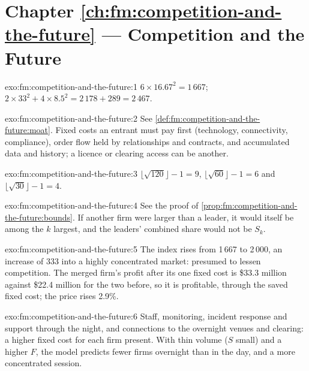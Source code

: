 \section*{Chapter \ref{ch:fm:competition-and-the-future} --- Competition and the Future}

\begin{solution}{exo:fm:competition-and-the-future:1}
$6\times16.67^2=1\,667$; $2\times33^2+4\times8.5^2=2\,178+289=2\,467$.
\end{solution}

\begin{solution}{exo:fm:competition-and-the-future:2}
See \cref{def:fm:competition-and-the-future:moat}. Fixed costs an entrant must pay first (technology, connectivity, compliance), order flow held by
relationships and contracts, and accumulated data and history; a licence or clearing access can be another.
\end{solution}

\begin{solution}{exo:fm:competition-and-the-future:3}
$\lfloor\sqrt{120}\rfloor-1=9$, $\lfloor\sqrt{60}\rfloor-1=6$ and $\lfloor\sqrt{30}\rfloor-1=4$.
\end{solution}

\begin{solution}{exo:fm:competition-and-the-future:4}
See the proof of \cref{prop:fm:competition-and-the-future:bounds}. If another firm were larger than a leader, it would itself be among the $k$
largest, and the leaders' combined share would not be $S_k$.
\end{solution}

\begin{solution}{exo:fm:competition-and-the-future:5}
The index rises from 1\,667 to 2\,000, an increase of 333 into a highly concentrated market: presumed to lessen competition. The merged firm's
profit after its one fixed cost is \$33.3 million against \$22.4 million for the two before, so it is profitable, through the saved fixed cost; the
price rises 2.9\%.
\end{solution}

\begin{solution}{exo:fm:competition-and-the-future:6}
Staff, monitoring, incident response and support through the night, and connections to the overnight venues and clearing: a higher fixed cost for
each firm present. With thin volume ($S$ small) and a higher $F$, the model predicts fewer firms overnight than in the day, and a more concentrated
session.
\end{solution}


